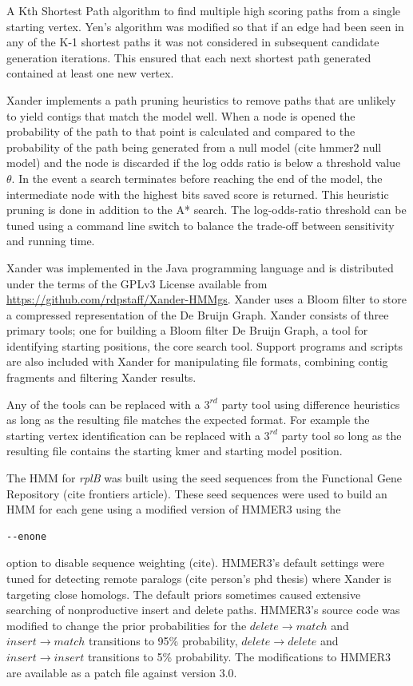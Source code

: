 \documentclass[10pt]{bmc_article}
\newenvironment{bmcformat}{\begin{raggedright}\baselineskip20pt\sloppy\setboolean{publ}{false}}{\end{raggedright}\baselineskip20pt\sloppy}
\begin{document}
\begin{bmcformat}
A Kth Shortest Path algorithm\cite{Yen1971}\cite{Lawler1972} to find multiple high scoring paths from a single starting vertex.  Yen's algorithm was modified so that if an edge had been seen in any of the K-1 shortest paths it was not considered in subsequent candidate generation iterations.  This ensured that each next shortest path generated contained at least one new vertex.

Xander implements a path pruning heuristics to remove paths that are unlikely to yield contigs that match the model well.  When a node is opened the probability of the path to that point is calculated and compared to the probability of the path being generated from a null model (cite hmmer2 null model) and the node is discarded if the log odds ratio is below a threshold value $\theta$. In the event a search terminates before reaching the end of the model, the intermediate node with the highest bits saved score is returned.  This heuristic pruning is done in addition to the A* search. The log-odds-ratio threshold can be tuned using a command line switch to balance the trade-off between sensitivity and running time.
  
Xander was implemented in the Java programming language and is distributed under the terms of the GPLv3 License available from \url{https://github.com/rdpstaff/Xander-HMMgs}.  Xander uses a Bloom filter to store a compressed representation of the De Bruijn Graph. Xander consists of three primary tools; one for building a Bloom filter De Bruijn Graph, a tool for identifying starting positions, the core search tool. Support programs and scripts are also included with Xander for manipulating file formats, combining contig fragments and filtering Xander results.

Any of the tools can be replaced with a $3^{rd}$ party tool using difference heuristics as long as the resulting file matches the expected format.  For example the starting vertex identification can be replaced with a $3^{rd}$ party tool so long as the resulting file contains the starting kmer and starting model position.

The HMM for \emph{rplB} was built using the seed sequences from the Functional Gene Repository (cite frontiers article).  These seed sequences were used to build an HMM for each gene using a modified version of HMMER3 using the \begin{verbatim}--enone\end{verbatim} option to disable sequence weighting (cite). HMMER3's default settings were tuned for detecting remote paralogs (cite person's phd thesis) where Xander is targeting close homologs.  The default priors sometimes caused extensive searching of nonproductive insert and delete paths. HMMER3's source code was modified to change the prior probabilities for the $delete \rightarrow match$ and $insert \rightarrow match$ transitions to 95\% probability, $delete \rightarrow delete$ and $insert \rightarrow insert$ transitions to 5\% probability.  The modifications to HMMER3 are available as a patch file against version 3.0.


\end{bmcformat}
\end{document}
